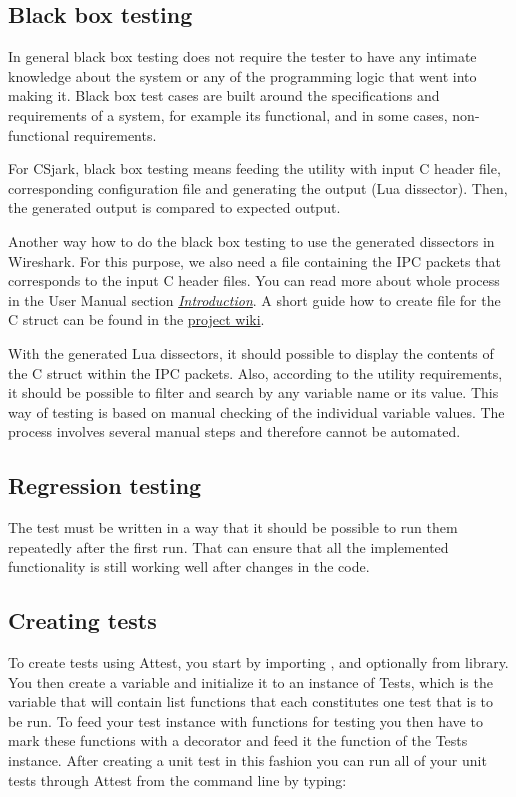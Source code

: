 \documentclass[A4paper,10pt,english]{sphinxmanual}
\begin{document}
\subsection{Black box testing}
\label{devel/testing:black-box-testing}
In general black box testing does not require the tester to have any intimate knowledge about the system or any of the programming logic that went into making it. Black box test cases are built around the specifications and requirements of a system, for example its functional, and in some cases, non-functional requirements.

For CSjark, black box testing means feeding the utility with input C header file, corresponding configuration file and generating the output (Lua dissector). Then, the generated output is compared to expected output.

Another way how to do the black box testing to use the generated dissectors in Wireshark. For this purpose, we also need a  file containing the IPC packets that corresponds to the input C header files. You can read more about whole process in the User Manual section {\hyperref[user/intro:intro]{\emph{Introduction}}}. A short guide how to create  file for the C struct can be found in the \href{https://github.com/eventh/kpro9/wiki/text2pcap}{project wiki}.

With the generated Lua dissectors, it should possible to display the contents of the C struct within the IPC packets. Also, according to the utility requirements, it should be possible to filter and search by any variable name or its value. This way of testing is based on manual checking of the individual variable values. The process involves several manual steps and therefore cannot be automated.


\subsection{Regression testing}
\label{devel/testing:project-wiki}\label{devel/testing:regression-testing}
The test must be written in a way that it should be possible to run them repeatedly after the first run. That can ensure that all the implemented functionality is still working well after changes in the code.


\subsection{Creating tests}
\label{devel/testing:creating-tests}
To create tests using Attest, you start by importing ,  and optionally  from  library. You then create a variable and initialize it to an instance of Tests, which is the variable that will contain list functions that each constitutes one test that is to be run. To feed your test instance with functions for testing you then have to mark these functions with a decorator and feed it the  function of the Tests instance. After creating a unit test in this fashion you can run all of your unit tests through Attest from the command line by typing:
\end{document}
